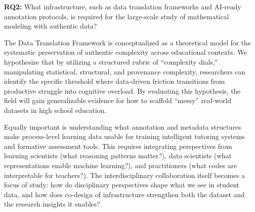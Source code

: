 \documentclass[11pt]{article}
\begin{document}
\begin{tcolorbox}[colback=mycmykcolor, colframe=black, boxrule=1pt, coltext=black]
\textbf{RQ2:} What infrastructure, such as data translation frameworks and AI-ready annotation protocols, is required for the large-scale study of mathematical modeling with authentic data?
\end{tcolorbox}


The Data Translation Framework is conceptualized as a theoretical model for the systematic preservation of authentic complexity across educational contexts.
We hypothesize that by utilizing a structured rubric of ``complexity dials," manipulating statistical, structural, and provenance complexity, researchers can identify the specific threshold where data-driven friction transitions from productive struggle into cognitive overload.
By evaluating this hypothesis, the field will gain generalizable evidence for how to scaffold ``messy'' real-world datasets in high school education.

Equally important is understanding what annotation and metadata structures make process-level learning data usable for training intelligent tutoring systems and formative assessment tools.
This requires integrating perspectives from learning scientists (what reasoning patterns matter?), data scientists (what representations enable machine learning?), and practitioners (what codes are interpretable for teachers?).
The interdisciplinary collaboration itself becomes a focus of study: how do disciplinary perspectives shape what we see in student data, and how does co-design of infrastructure strengthen both the dataset and the research insights it enables?

\end{document}
